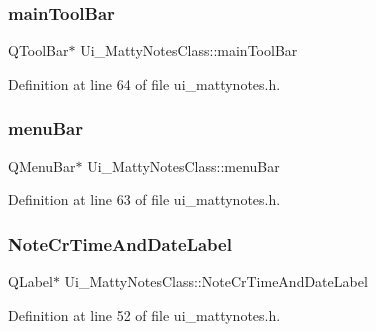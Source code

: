 \hypertarget{classUi__MattyNotesClass_a4ff9c72ed35ac4d0873ea7398281e0fe}{}\label{classUi__MattyNotesClass_a4ff9c72ed35ac4d0873ea7398281e0fe} 
\subsubsection{\texorpdfstring{main\+Tool\+Bar}{mainToolBar}}
{\footnotesize\ttfamily Q\+Tool\+Bar$\ast$ Ui\+\_\+\+Matty\+Notes\+Class\+::main\+Tool\+Bar}



Definition at line 64 of file ui\+\_\+mattynotes.\+h.

\hypertarget{classUi__MattyNotesClass_ac32889547eae8466a915c6aac099df4a}{}\label{classUi__MattyNotesClass_ac32889547eae8466a915c6aac099df4a} 
\subsubsection{\texorpdfstring{menu\+Bar}{menuBar}}
{\footnotesize\ttfamily Q\+Menu\+Bar$\ast$ Ui\+\_\+\+Matty\+Notes\+Class\+::menu\+Bar}



Definition at line 63 of file ui\+\_\+mattynotes.\+h.

\hypertarget{classUi__MattyNotesClass_a809a1da050008644a0b8e986348d952d}{}\label{classUi__MattyNotesClass_a809a1da050008644a0b8e986348d952d} 
\subsubsection{\texorpdfstring{Note\+Cr\+Time\+And\+Date\+Label}{NoteCrTimeAndDateLabel}}
{\footnotesize\ttfamily Q\+Label$\ast$ Ui\+\_\+\+Matty\+Notes\+Class\+::\+Note\+Cr\+Time\+And\+Date\+Label}



Definition at line 52 of file ui\+\_\+mattynotes.\+h.

